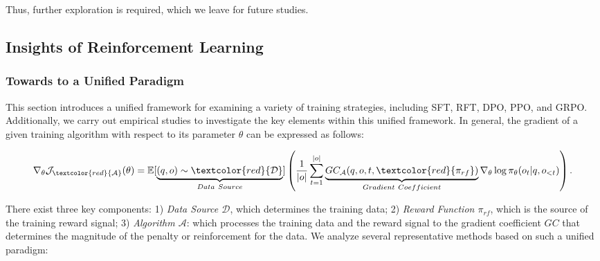\begin{itemize}[topsep=0pt]
\begin{itemize}[topsep=0pt]
Thus, further exploration is required, which we leave for future studies.

\subsection{Insights of Reinforcement Learning}
\subsubsection{Towards to a Unified Paradigm} This section introduces a unified framework for examining a variety of training strategies, including SFT, RFT, DPO, PPO, and GRPO. Additionally, we carry out empirical studies to investigate the key elements within this unified framework. In general, the gradient of a given training algorithm with respect to its parameter $\theta$ can be expressed as follows:

\begin{equation}
    \nabla_{\theta}\mathcal{J}_{\textcolor{red}{\mathcal{A}}}(\theta) = \mathbb{E}[\underbrace{(q,o) \sim \textcolor{red}{\mathcal{D}}}_{Data \ Source}]\left( \frac{1}{|o|} \sum_{t=1}^{|o|}  \underbrace{GC_{{\mathcal{A}}}(q, o, t, \textcolor{red}{\pi_{{rf}}})}_{Gradient \ Coefficient}  \nabla_{\theta}\log \pi_{\theta}(o_t | q, o_{<t})\right).
\label{eq:objective}
\end{equation}

There exist three key components: 1) \textit{Data Source $\mathcal{D}$}, which determines the training data; 2) \textit{Reward Function $\pi_{{rf}}$}, which is the source of the training reward signal; 3) \textit{Algorithm $\mathcal{A}$}: which processes the training data and the reward signal to the gradient coefficient $GC$ that determines the magnitude of the penalty or reinforcement for the data. We analyze several representative methods based on such a unified paradigm:


\end{itemize}
\end{itemize}
